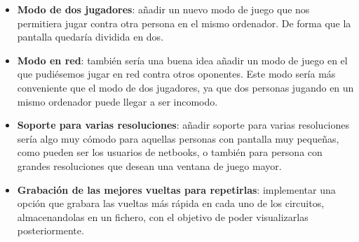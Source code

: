 \documentclass[a4paper,11pt]{article} %
\begin{document}
\begin{itemize}
    \item \textbf{Modo de dos jugadores}: añadir un nuevo modo de juego que nos permitiera jugar contra otra persona en el mismo
    ordenador. De forma que la pantalla quedaría dividida en dos.
    
    \item \textbf{Modo en red}: también sería una buena idea añadir un modo de
    juego en el que pudiésemos jugar en red contra otros
    oponentes. Este modo sería más conveniente que el modo de dos jugadores, ya que dos personas jugando en un mismo ordenador
    puede llegar a ser incomodo.
     
    \item \textbf{Soporte para varias resoluciones}: añadir soporte para varias resoluciones sería algo muy cómodo para aquellas 
    personas con pantalla muy pequeñas, como pueden ser los usuarios de netbooks, o también para persona con grandes resoluciones
    que desean una ventana de juego mayor.
    
    \item \textbf{Grabación de las mejores vueltas para repetirlas}: implementar una opción que grabara las vueltas más rápida en
    cada uno de los circuitos, almacenandolas en un fichero, con el objetivo de poder visualizarlas posteriormente.
\end{itemize}

\end{document}
